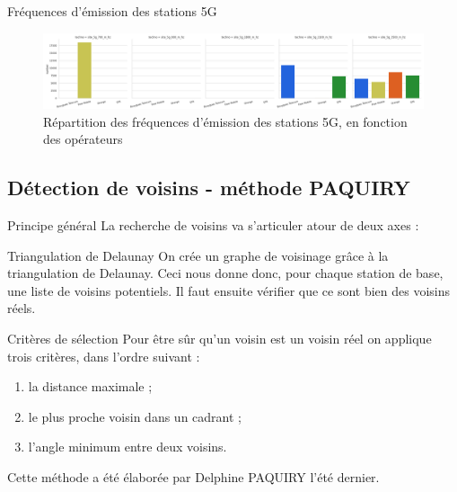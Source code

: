 \begin{frame}{Fréquences d'émission des stations 5G}
    \begin{figure}
        \includegraphics[width=0.9\paperwidth]{images/barplots/5G_freq.png}
        \caption{\label{fig:5g_freq}Répartition des fréquences d'émission des stations 5G, en fonction des opérateurs}
    \end{figure}
\end{frame}

\subsection{Détection de voisins - méthode PAQUIRY}
\insertsubsectionframe

\begin{frame}{Principe général}
    La recherche de voisins va s'articuler atour de deux axes :
    \begin{block}{Triangulation de Delaunay}
        On crée un graphe de voisinage grâce à la triangulation de Delaunay. Ceci nous donne donc, pour chaque station de base, une liste de voisins potentiels.
        Il faut ensuite vérifier que ce sont bien des voisins réels.
    \end{block}
    \begin{block}{Critères de sélection}
        Pour être sûr qu'un voisin est un voisin réel on applique trois critères, dans l'ordre suivant :
        \begin{enumerate}
            \item la distance maximale ;
            \item le plus proche voisin dans un cadrant ;
            \item l'angle minimum entre deux voisins.
        \end{enumerate}
    \end{block}
    Cette méthode a été élaborée par Delphine PAQUIRY l'été dernier.
\end{frame}

